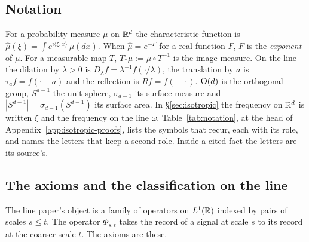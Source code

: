 \subsection{Notation}\label{sec:notation}

For a probability measure $\mu$ on $\mathbb{R}^d$ the characteristic function is
$\widehat\mu(\xi) = \int e^{i\langle\xi,x\rangle}\,\mu(dx)$. When $\widehat\mu = e^{-F}$ for a
real function $F$, $F$ is the \emph{exponent} of $\mu$. For a measurable map $T$, $T_*\mu := \mu \circ T^{-1}$ is the image measure. On the
line the dilation by $\lambda > 0$ is $D_\lambda f = \lambda^{-1}f(\cdot/\lambda)$, the translation
by $a$ is $\tau_af = f(\cdot - a)$ and the reflection is $Rf = f(-\,\cdot)$. $\mathrm{O}(d)$ is the
orthogonal group, $S^{d-1}$ the unit sphere, $\sigma_{d-1}$ its surface measure and
$|S^{d-1}| = \sigma_{d-1}(S^{d-1})$ its surface area. In
\S\ref{sec:isotropic} the frequency on $\mathbb{R}^d$ is written $\xi$ and the frequency on the line
$\omega$. Table~\ref{tab:notation}, at the head of Appendix~\ref{app:isotropic-proofs}, lists
the symbols that recur, each with its role, and names the letters that keep a second role.
Inside a cited fact the letters are its source's.

\subsection{The axioms and the classification on the line}\label{sec:line-axioms}

The line paper's object is a family of operators on $L^1(\mathbb{R})$ indexed by pairs of scales
$s \le t$. The operator $\Phi_{s,t}$ takes the record of a signal at scale $s$ to its record at the
coarser scale $t$. The axioms are these.


